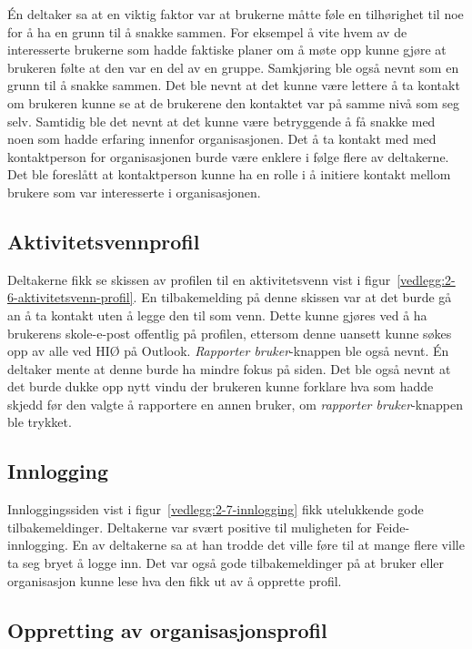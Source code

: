 Én deltaker sa at en viktig faktor var at brukerne måtte føle en tilhørighet til noe for å ha en grunn til å snakke sammen. For eksempel å vite hvem av de interesserte brukerne som hadde faktiske planer om å møte opp kunne gjøre at brukeren følte at den var en del av en gruppe. Samkjøring ble også nevnt som en grunn til å snakke sammen. Det ble nevnt at det kunne være lettere å ta kontakt om brukeren kunne se at de brukerene den kontaktet var på samme nivå som seg selv. Samtidig ble det nevnt at det kunne være betryggende å få snakke med noen som hadde erfaring innenfor organisasjonen. Det å ta kontakt med med kontaktperson for organisasjonen burde være enklere i følge flere av deltakerne. Det ble foreslått at kontaktperson kunne ha en rolle i å initiere kontakt mellom brukere som var interesserte i organisasjonen.


\subsection{Aktivitetsvennprofil}

Deltakerne fikk se skissen av profilen til en aktivitetsvenn vist i figur~\ref{vedlegg:2-6-aktivitetsvenn-profil}. En tilbakemelding på denne skissen var at det burde gå an å ta kontakt uten å legge den til som venn. Dette kunne gjøres ved å ha brukerens skole-e-post offentlig på profilen, ettersom denne uansett kunne søkes opp av alle ved HIØ på Outlook. {\em Rapporter bruker}-knappen ble også nevnt. Én deltaker mente at denne burde ha mindre fokus på siden. Det ble også nevnt at det burde dukke opp nytt vindu der brukeren kunne forklare hva som hadde skjedd før den valgte å rapportere en annen bruker, om {\em rapporter bruker}-knappen ble trykket.


\subsection{Innlogging}

Innloggingssiden vist i figur~\ref{vedlegg:2-7-innlogging} fikk utelukkende gode tilbakemeldinger. Deltakerne var svært positive til muligheten for Feide-innlogging. En av deltakerne sa at han trodde det ville føre til at mange flere ville ta seg bryet å logge inn. Det var også gode tilbakemeldinger på at bruker eller organisasjon kunne lese hva den fikk ut av å opprette profil.


\subsection{Oppretting av organisasjonsprofil}

